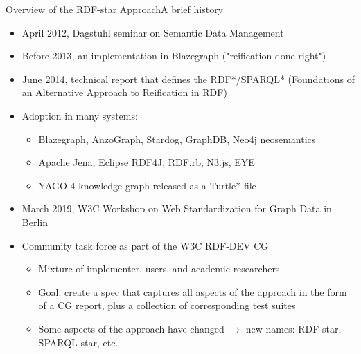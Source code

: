 \documentclass[aspectratio=169]{beamer}
\begin{document}
\begin{frame}{Overview of the RDF-star Approach}{A brief history}

    \begin{itemize}
        \item April 2012, Dagstuhl seminar on Semantic Data Management
        \item Before 2013, an implementation in Blazegraph ("reification done right")
        \item June 2014, technical report that defines the RDF*/SPARQL* (Foundations of an Alternative Approach to Reification in RDF)
        \item Adoption in many systems:
            \begin{itemize}
                \item Blazegraph, AnzoGraph, Stardog, GraphDB, Neo4j neosemantics
                \item Apache Jena, Eclipse RDF4J, RDF.rb, N3.js, EYE
                \item YAGO 4 knowledge graph released as a Turtle* file
            \end{itemize}
        \item March 2019, W3C Workshop on Web Standardization for Graph Data in Berlin
        \item Community task force as part of the W3C RDF-DEV CG
            \begin{itemize}
                \item Mixture of implementer, users, and academic researchers
                \item Goal: create a spec that captures all aspects of the approach in the form of a CG report, plus a collection of corresponding test suites
                \item Some aspects of the approach have changed $\rightarrow$ new-names: RDF-star, SPARQL-star, etc.
            \end{itemize}
    \end{itemize}

\end{frame}

    
\end{document}
